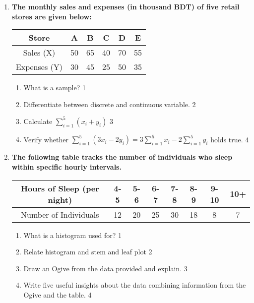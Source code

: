 \documentclass{article}
\begin{document}
  \begin{enumerate}

\item
\textbf{The monthly sales and expenses (in thousand BDT) of five retail 
stores are given below:}

\begin{table}[h]
\centering
\begin{tabular}{c|ccccc}
Store & A & B & C & D & E \\ \hline
Sales (X) & 50 & 65 & 40 & 70 & 55 \\ \hline
Expenses (Y) & 30 & 45 & 25 & 50 & 35
\end{tabular}
\end{table}

\begin{enumerate}
  \item What is a sample? \hfill 1
  \item Differentiate between discrete and continuous variable. \hfill 2
    \item 
    Calculate $\displaystyle \sum_{i=1}^5 (x_i + y_i)$ \hfill 3
    \item 
    Verify whether $\displaystyle \sum_{i=1}^5 (3x_i - 2y_i) = 3 
    \sum_{i=1}^5 x_i - 2 \sum_{i=1}^5 y_i$ holds true. \hfill 4
\end{enumerate}

     \item
	  \textbf{The following table tracks the number of individuals who sleep 
	  within specific hourly intervals. }
	  
\begin{table}[h]
  \centering
\begin{tabular}{c|c|c|c|c|c|c|c}
Hours of Sleep (per night) & 4-5   & 5-6   & 6-7   & 7-8   & 8-9   & 9-10  & 10+   \\ \hline
Number of Individuals      & 12    & 20    & 25    & 30    & 18    & 8     & 7     
\end{tabular}
\end{table}


  \begin{enumerate}
    \item  What is a histogram used for? \hfill 1
    \item Relate histogram and stem and leaf plot \hfill 2
      \item 
	Draw an Ogive from the data provided and explain. \hfill 3
    \item
	Write five useful insights about the data combining information from 
	the Ogive and the table. \hfill 4
  \end{enumerate}


\end{enumerate}
\end{document}
